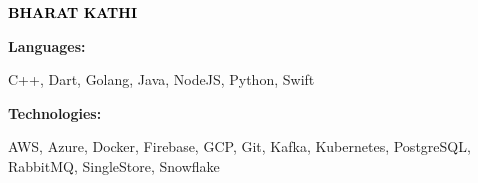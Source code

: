 \documentclass[9pt]{developercv} %
\begin{document}

\begin{minipage}[t]{0.5\textwidth} 
	\vspace{-\baselineskip} %
	
	{ \fontsize{16}{20} \textcolor{black}{\textbf{\MakeUppercase{Bharat Kathi}}}} %
	
	\vspace{6pt}
    \hspace{22pt}

    \hspace{12pt}
    
\end{minipage}
\hfill
\begin{minipage}[t]{0.5\textwidth}
    \vspace{-18pt}
    \vspace{-6pt}
    
    \begin{minipage}[t]{0.2\textwidth}
        \textbf{Languages:}
    \end{minipage}
    \hfill
    \begin{minipage}[t]{0.73\textwidth}
        C++, Dart, Golang, Java, NodeJS, Python, Swift
    \end{minipage}
    \vspace{5 pt}
    
    \begin{minipage}[t]{0.2\textwidth}
        \textbf{Technologies:}
    \end{minipage}
    \hfill
    \begin{minipage}[t]{0.73\textwidth}
        AWS, Azure, Docker, Firebase, GCP, Git, Kafka, Kubernetes, PostgreSQL, RabbitMQ, SingleStore, Snowflake
    \end{minipage}
    
\end{minipage}
\end{document}
